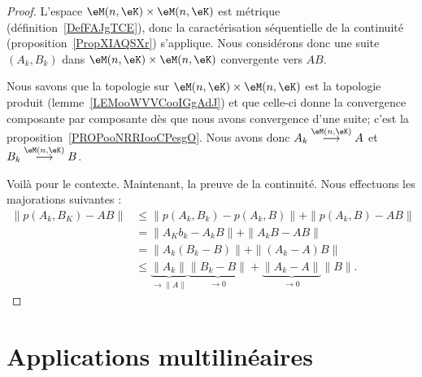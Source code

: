 \begin{proof}
    L'espace \( \eM(n,\eK)\times \eM(n,\eK)\) est métrique (définition~\ref{DefFAJgTCE}), donc la caractérisation séquentielle de la continuité (proposition~\ref{PropXIAQSXr}) s'applique. Nous considérons donc une suite \( (A_k,B_k)\) dans \( \eM(n,\eK)\times \eM(n,\eK)\) convergente vers \( AB\).

    Nous savons que la topologie sur \( \eM(n,\eK)\times \eM(n,\eK)\) est la topologie produit (lemme~\ref{LEMooWVVCooIGgAdJ}) et que celle-ci donne la convergence composante par composante dès que nous avons convergence d'une suite; c'est la proposition~\ref{PROPooNRRIooCPesgO}. Nous avons donc \( A_k\stackrel{\eM(n,\eK)}{\longrightarrow}A\) et \( B_k\stackrel{\eM(n,\eK)}{\longrightarrow}B\).

    Voilà pour le contexte. Maintenant, la preuve de la continuité. Nous effectuons les majorations suivantes :
    \begin{subequations}
        \begin{align}
            \| p(A_k,B_K)-AB \|&\leq \| p(A_k,B_k)-p(A_k,B) \|+\| p(A_k,B)-AB \|\\
            &=\| A_Kb_k-A_kB \|+\| A_kB-AB \|\\
            &=\| A_k(B_k-B) \|+\| (A_k-A)B \|\\
            &\leq \underbrace{\| A_k \|}_{\to \| A \|}\underbrace{\| B_k-B \|}_{\to 0}+\underbrace{\| A_k-A \|}_{\to 0}\| B \|.
        \end{align}
    \end{subequations}
\end{proof}

\section{Applications multilinéaires}

